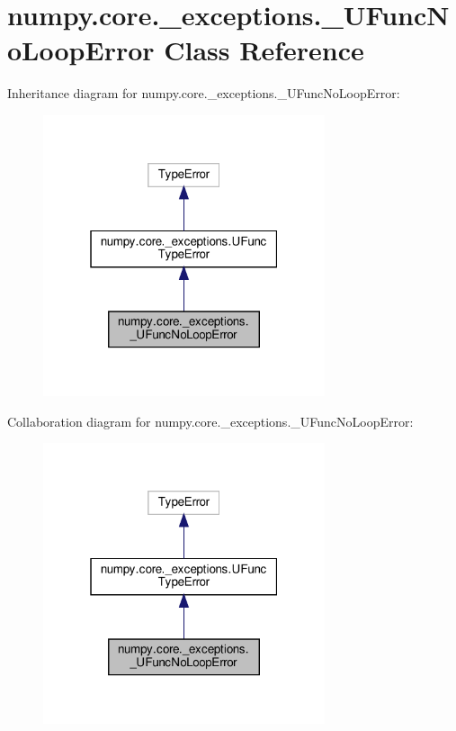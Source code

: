 \hypertarget{classnumpy_1_1core_1_1__exceptions_1_1__UFuncNoLoopError}{}\section{numpy.\+core.\+\_\+exceptions.\+\_\+\+U\+Func\+No\+Loop\+Error Class Reference}
\label{classnumpy_1_1core_1_1__exceptions_1_1__UFuncNoLoopError}


Inheritance diagram for numpy.\+core.\+\_\+exceptions.\+\_\+\+U\+Func\+No\+Loop\+Error\+:
\nopagebreak
\begin{figure}[H]
\begin{center}
\leavevmode
\includegraphics[width=235pt]{classnumpy_1_1core_1_1__exceptions_1_1__UFuncNoLoopError__inherit__graph}
\end{center}
\end{figure}


Collaboration diagram for numpy.\+core.\+\_\+exceptions.\+\_\+\+U\+Func\+No\+Loop\+Error\+:
\nopagebreak
\begin{figure}[H]
\begin{center}
\leavevmode
\includegraphics[width=235pt]{classnumpy_1_1core_1_1__exceptions_1_1__UFuncNoLoopError__coll__graph}
\end{center}
\end{figure}

